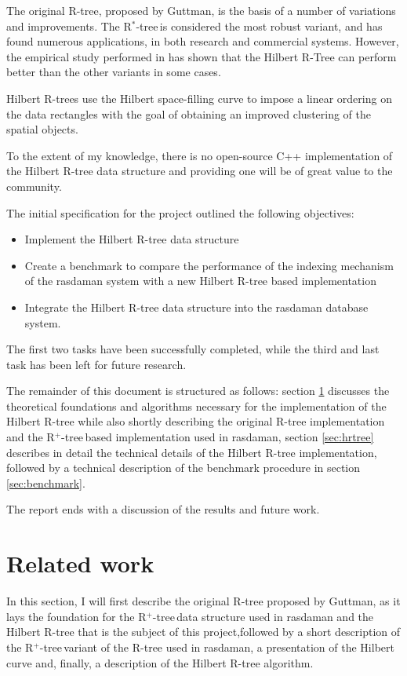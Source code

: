 \documentclass[11pt, a4paper, oneside]{article}
\newcommand{\rplus}{R$^+$-tree$\,$}
\newcommand{\rstar}{R$^*$-tree$\,$}
\begin{document}
The original R-tree, proposed by Guttman, is the basis of a number of variations and improvements\cite{Manolopoulos:2005:RTA:1098699}. The \rstar is considered the most robust variant, and has found numerous applications, in both research and commercial systems. However, the empirical study performed in \cite{Kamel:1994:HRI:645920.673001} has shown that the Hilbert R-Tree can perform better than the other variants in some cases.

Hilbert R-trees use the Hilbert space-filling curve to impose a linear ordering on the data rectangles with the goal of obtaining an improved clustering of the spatial objects.

To the extent of my knowledge, there is no open-source C++ implementation of the Hilbert R-tree data structure and providing one will be of great value to the community.

The initial specification for the project outlined the following objectives:
\begin{itemize}
\item Implement the Hilbert R-tree data structure
\item Create a benchmark to compare the performance of the indexing mechanism of the rasdaman system with a new Hilbert R-tree based implementation
\item Integrate the Hilbert R-tree data structure into the rasdaman database system.
\end{itemize}

The first two tasks have been successfully completed, while the third and last task has been left for future research.

The remainder of this document is structured as follows: section \ref{sec:related} discusses the theoretical foundations and algorithms necessary for the implementation of the Hilbert R-tree while also shortly describing the original R-tree implementation and the \rplus based implementation used in rasdaman, section \ref{sec:hrtree} describes in detail the technical details of the Hilbert R-tree implementation, followed by a technical description of the benchmark procedure in section \ref{sec:benchmark}.

The report ends with a discussion of the results and future work.

\section{Related work}
\label{sec:related}

In this section, I will first describe the original R-tree proposed by Guttman, as it lays the foundation for the \rplus data structure used in rasdaman and the Hilbert R-tree that is the subject of this project,followed by a short description of the \rplus variant of the R-tree used in rasdaman, a presentation of the Hilbert curve and, finally, a description of the Hilbert R-tree algorithm.
\end{document}
